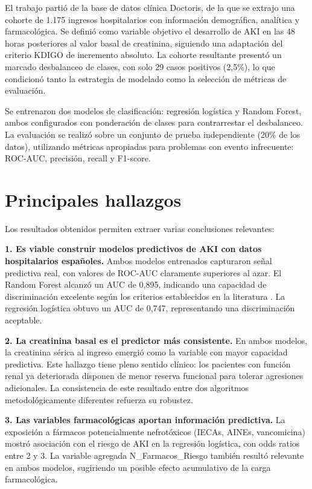 \documentclass[12pt, a4paper, oneside]{report}
\begin{document}
El trabajo partió de la base de datos clínica Doctoris, de la que se extrajo una cohorte de 1.175 ingresos hospitalarios con información demográfica, analítica y farmacológica. Se definió como variable objetivo el desarrollo de AKI en las 48 horas posteriores al valor basal de creatinina, siguiendo una adaptación del criterio KDIGO de incremento absoluto. La cohorte resultante presentó un marcado desbalanceo de clases, con solo 29 casos positivos (2,5\%), lo que condicionó tanto la estrategia de modelado como la selección de métricas de evaluación.

Se entrenaron dos modelos de clasificación: regresión logística y Random Forest, ambos configurados con ponderación de clases para contrarrestar el desbalanceo. La evaluación se realizó sobre un conjunto de prueba independiente (20\% de los datos), utilizando métricas apropiadas para problemas con evento infrecuente: ROC-AUC, precisión, recall y F1-score.

\section{Principales hallazgos}

Los resultados obtenidos permiten extraer varias conclusiones relevantes:

\textbf{1. Es viable construir modelos predictivos de AKI con datos hospitalarios españoles.} Ambos modelos entrenados capturaron señal predictiva real, con valores de ROC-AUC claramente superiores al azar. El Random Forest alcanzó un AUC de 0,895, indicando una capacidad de discriminación excelente según los criterios establecidos en la literatura \cite{hosmer2013applied}. La regresión logística obtuvo un AUC de 0,747, representando una discriminación aceptable.

\textbf{2. La creatinina basal es el predictor más consistente.} En ambos modelos, la creatinina sérica al ingreso emergió como la variable con mayor capacidad predictiva. Este hallazgo tiene pleno sentido clínico: los pacientes con función renal ya deteriorada disponen de menor reserva funcional para tolerar agresiones adicionales. La consistencia de este resultado entre dos algoritmos metodológicamente diferentes refuerza su robustez.

\textbf{3. Las variables farmacológicas aportan información predictiva.} La exposición a fármacos potencialmente nefrotóxicos (IECAs, AINEs, vancomicina) mostró asociación con el riesgo de AKI en la regresión logística, con odds ratios entre 2 y 3. La variable agregada N\_Farmacos\_Riesgo también resultó relevante en ambos modelos, sugiriendo un posible efecto acumulativo de la carga farmacológica.
\end{document}
